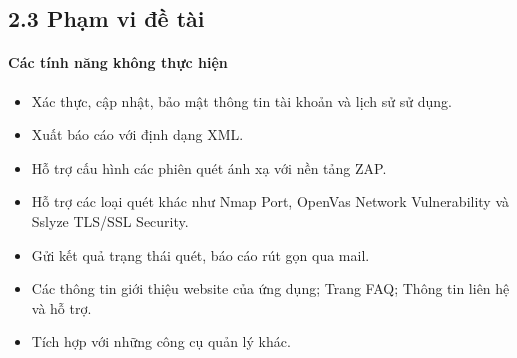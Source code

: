 \subsection*{2.3  Phạm vi đề tài}
\paragraph{Các tính năng không thực hiện}
\begin{itemize}
    \item Xác thực, cập nhật, bảo mật thông tin tài khoản và lịch sử sử dụng.
    \item Xuất báo cáo với định dạng XML.
    \item Hỗ trợ cấu hình các phiên quét ánh xạ với nền tảng ZAP.
    \item Hỗ trợ các loại quét khác như Nmap Port, OpenVas Network Vulnerability và Sslyze TLS/SSL Security.
    \item Gửi kết quả trạng thái quét, báo cáo rút gọn qua mail.
    \item Các thông tin giới thiệu website của ứng dụng; Trang FAQ; Thông tin liên hệ và hỗ trợ.
    \item Tích hợp với những công cụ quản lý khác.
\end{itemize}